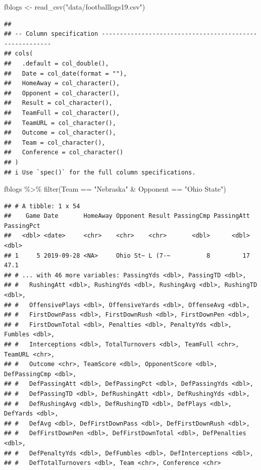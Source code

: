 \documentclass[
]{book}
\newenvironment{Shaded}{\begin{snugshade}}{\end{snugshade}}
\newcommand{\FunctionTok}[1]{\textcolor[rgb]{0.00,0.00,0.00}{#1}}
\newcommand{\NormalTok}[1]{#1}
\newcommand{\OtherTok}[1]{\textcolor[rgb]{0.56,0.35,0.01}{#1}}
\newcommand{\SpecialCharTok}[1]{\textcolor[rgb]{0.00,0.00,0.00}{#1}}
\newcommand{\StringTok}[1]{\textcolor[rgb]{0.31,0.60,0.02}{#1}}
\begin{document}
\begin{Shaded}
\begin{Highlighting}[]
\NormalTok{fblogs }\OtherTok{\textless{}{-}} \FunctionTok{read\_csv}\NormalTok{(}\StringTok{"data/footballlogs19.csv"}\NormalTok{)}
\end{Highlighting}
\end{Shaded}

\begin{verbatim}
## 
## -- Column specification --------------------------------------------------------
## cols(
##   .default = col_double(),
##   Date = col_date(format = ""),
##   HomeAway = col_character(),
##   Opponent = col_character(),
##   Result = col_character(),
##   TeamFull = col_character(),
##   TeamURL = col_character(),
##   Outcome = col_character(),
##   Team = col_character(),
##   Conference = col_character()
## )
## i Use `spec()` for the full column specifications.
\end{verbatim}

\begin{Shaded}
\begin{Highlighting}[]
\NormalTok{fblogs }\SpecialCharTok{\%\textgreater{}\%} \FunctionTok{filter}\NormalTok{(Team }\SpecialCharTok{==} \StringTok{"Nebraska"} \SpecialCharTok{\&}\NormalTok{ Opponent }\SpecialCharTok{==} \StringTok{"Ohio State"}\NormalTok{)}
\end{Highlighting}
\end{Shaded}

\begin{verbatim}
## # A tibble: 1 x 54
##    Game Date       HomeAway Opponent Result PassingCmp PassingAtt PassingPct
##   <dbl> <date>     <chr>    <chr>    <chr>       <dbl>      <dbl>      <dbl>
## 1     5 2019-09-28 <NA>     Ohio St~ L (7-~          8         17       47.1
## # ... with 46 more variables: PassingYds <dbl>, PassingTD <dbl>,
## #   RushingAtt <dbl>, RushingYds <dbl>, RushingAvg <dbl>, RushingTD <dbl>,
## #   OffensivePlays <dbl>, OffensiveYards <dbl>, OffenseAvg <dbl>,
## #   FirstDownPass <dbl>, FirstDownRush <dbl>, FirstDownPen <dbl>,
## #   FirstDownTotal <dbl>, Penalties <dbl>, PenaltyYds <dbl>, Fumbles <dbl>,
## #   Interceptions <dbl>, TotalTurnovers <dbl>, TeamFull <chr>, TeamURL <chr>,
## #   Outcome <chr>, TeamScore <dbl>, OpponentScore <dbl>, DefPassingCmp <dbl>,
## #   DefPassingAtt <dbl>, DefPassingPct <dbl>, DefPassingYds <dbl>,
## #   DefPassingTD <dbl>, DefRushingAtt <dbl>, DefRushingYds <dbl>,
## #   DefRushingAvg <dbl>, DefRushingTD <dbl>, DefPlays <dbl>, DefYards <dbl>,
## #   DefAvg <dbl>, DefFirstDownPass <dbl>, DefFirstDownRush <dbl>,
## #   DefFirstDownPen <dbl>, DefFirstDownTotal <dbl>, DefPenalties <dbl>,
## #   DefPenaltyYds <dbl>, DefFumbles <dbl>, DefInterceptions <dbl>,
## #   DefTotalTurnovers <dbl>, Team <chr>, Conference <chr>
\end{verbatim}
\end{document}
